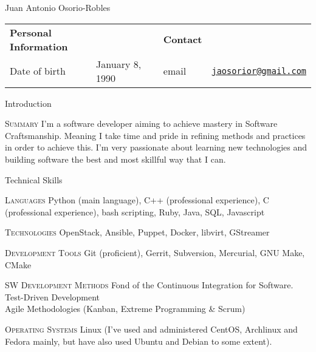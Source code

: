 \documentclass[english,10pt,letterpaper]{article}
\begin{document}
\centering
\begin{cv}{Juan Antonio Osorio-Robles}

	\begin{table}[h]
		\begin{tabular}{@{} l l p{0.5cm} l r}
			{\bf Personal Information}	&	&	&	{\bf Contact}	&\\
			Date of birth &	January 8, 1990	&	&
			email & \href{mailto:jaosorior@gmail.com}{\tt jaosorior@gmail.com}\\
		\end{tabular}
	\end{table}

	\begin{cvlist}{Introduction}
        \item[\textsc{Summary}]
            I'm a software developer aiming to achieve mastery in Software
            Craftsmanship. Meaning I take time and pride in refining
            methods and practices in order to achieve this. I'm very passionate
            about learning new technologies and building software the best and
            most skillful way that I can.
	\end{cvlist}


	\begin{cvlist}{Technical Skills}
			\item [\textsc{Languages}]
                Python (main language), C++ (professional experience), C
                (professional experience), bash scripting, Ruby, Java, SQL,
                Javascript
			\item [\textsc{Technologies}]
                OpenStack, Ansible, Puppet, Docker, libvirt, GStreamer
			\item [\textsc{Development Tools}]
                Git (proficient), Gerrit, Subversion, Mercurial, GNU Make, CMake
			\item [\textsc{SW Development Methods}]
				Fond of the Continuous Integration for Software.\\
                Test-Driven Development\\
                Agile Methodologies (Kanban, Extreme Programming \& Scrum)
			\item [\textsc{Operating Systems}]
                Linux (I've used and administered CentOS, Archlinux and Fedora
                mainly, but have also used Ubuntu and Debian to some extent).
	\end{cvlist}


\end{cv}
\end{document}
